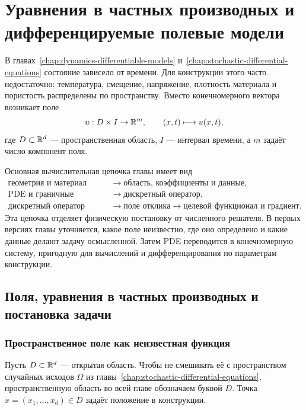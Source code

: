 
\chapter{Уравнения в частных производных и дифференцируемые полевые модели}
\label{chap:partial-differential-equations}

В главах~\ref{chap:dynamics-differentiable-models} и~\ref{chap:stochastic-differential-equations} состояние зависело от времени. Для конструкции этого часто недостаточно: температура, смещение, напряжение, плотность материала и пористость распределены по пространству. Вместо конечномерного вектора возникает поле
\[
u:D\times I\to\mathbb{R}^m,
\qquad
(x,t)\longmapsto u(x,t),
\]
где $D\subset\mathbb{R}^d$ --- пространственная область, $I$ --- интервал времени, а $m$ задаёт число компонент поля.

Основная вычислительная цепочка главы имеет вид
\[
\begin{aligned}
\text{геометрия и материал}
&\longrightarrow
\text{область, коэффициенты и данные},\\
\text{PDE и граничные условия}
&\longrightarrow
\text{дискретный оператор},\\
\text{дискретный оператор}
&\longrightarrow
\text{поле отклика}
\longrightarrow
\text{целевой функционал и градиент}.
\end{aligned}
\]
Эта цепочка отделяет физическую постановку от численного решателя. В первых версиях главы уточняется, какое поле неизвестно, где оно определено и какие данные делают задачу осмысленной. Затем PDE переводится в конечномерную систему, пригодную для вычислений и дифференцирования по параметрам конструкции.

\section{Поля, уравнения в частных производных и постановка задачи}
\label{sec:pde-fields-and-problem-statement}

\subsection{Пространственное поле как неизвестная функция}

Пусть $D\subset\mathbb{R}^d$ --- открытая область. Чтобы не смешивать её с пространством случайных исходов $\Omega$ из главы~\ref{chap:stochastic-differential-equations}, пространственную область во всей главе обозначаем буквой $D$. Точка $x=(x_1,\ldots,x_d)\in D$ задаёт положение в конструкции.

